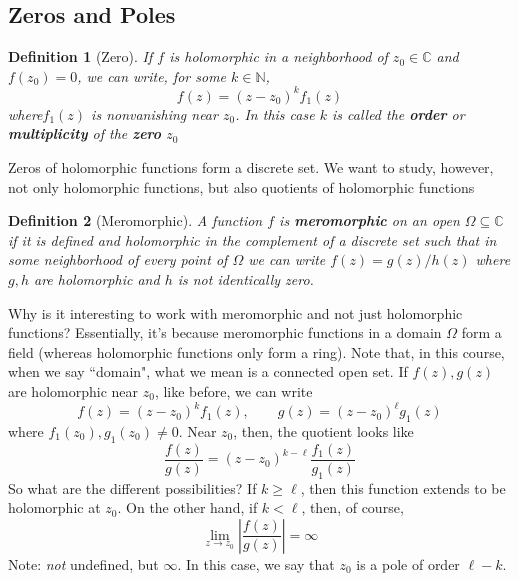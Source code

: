 \documentclass{article}
\newcommand{\mbb}[1]{\mathbb{#1}}
\newtheorem{definition}{Definition}
\begin{document}
\subsection{Zeros and Poles}

\begin{definition}[Zero]
If \(f\) is holomorphic in a neighborhood of \(z_0 \in \mbb{C}\) and \(f(z_0) = 0\), we can write, for some \(k \in \mbb{N}\),
\begin{equation}f(z) = (z - z_0)^kf_1(z)\end{equation}
where\(f_1(z)\) is nonvanishing near \(z_0\). In this case \(k\) is called the \textbf{order} or \textbf{multiplicity} of the \textbf{zero} \(z_0\)
\end{definition}
Zeros of holomorphic functions form a discrete set. We want to study, however, not only holomorphic functions, but also quotients of holomorphic functions
\begin{definition}[Meromorphic]
A function \(f\) is \textbf{meromorphic} on an open \(\Omega \subseteq \mbb{C}\) if it is defined and holomorphic in the complement of a discrete set such that in some neighborhood of every point of \(\Omega\) we can write
\(f(z) = g(z)/h(z)\)
where \(g, h\) are holomorphic and \(h\) is not identically zero.
\end{definition}
Why is it interesting to work with meromorphic and not just holomorphic functions? Essentially, it's because meromorphic functions in a domain \(\Omega\) form a field (whereas holomorphic functions only form a ring). Note that, in this course, when we say ``domain", what we mean is a connected open set.
If \(f(z), g(z)\) are holomorphic near \(z_0\), like before, we can write
\begin{equation}f(z) = (z - z_0)^kf_1(z), \qquad g(z) = (z - z_0)^\ell g_1(z)\end{equation}
where \(f_1(z_0), g_1(z_0) \neq 0\). Near \(z_0\), then, the quotient looks like
\begin{equation}\frac{f(z)}{g(z)} = (z - z_0)^{k - \ell}\frac{f_1(z)}{g_1(z)}\end{equation}
So what are the different possibilities? If \(k \geq \ell\), then this function extends to be holomorphic at \(z_0\). On the other hand, if \(k < \ell\), then, of course,
\begin{equation}\lim_{z \to z_0}\left|\frac{f(z)}{g(z)}\right| = \infty\end{equation}
Note: \textit{not} undefined, but \(\infty\). In this case, we say that \(z_0\) is a pole of order \(\ell - k\).
\end{document}
